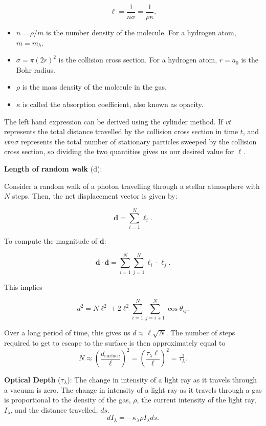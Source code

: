 \documentclass[12pt]{article}
\newcommand{\V}{

\vspace{\baselineskip}

}
\begin{document}
\[\ell = \frac{1}{n\sigma} = \frac{1}{\rho \kappa}.\]

\begin{itemize}
    \item $n = \rho / m$ is the number density of the molecule. For a hydrogen atom, $m = m_h$. 
    \item $\sigma = \pi(2r)^2$ is the collision cross section. For a hydrogen atom, $r = a_0$ is the Bohr radius. 
    \item $\rho$ is the mass density of the molecule in the gas.
    \item $\kappa$ is called the absorption coefficient, also known as opacity. 
\end{itemize}

The left hand expression can be derived using the cylinder method. If $vt$ represents the total distance travelled by the collision cross section in time $t$, and $vtn\sigma$ represents the total number of stationary particles sweeped by the collision cross section, so dividing the two quantities gives us our desired value for $\ell$.\V

\textbf{Length of random walk} (d): 

Consider a random walk of a photon travelling through a stellar atmosphere with $N$ steps. Then, the net displacement vector is given by: 

\[\mathbf{d} = \sum_{i=1}^N \bm{\ell}_i.\]

To compute the magnitude of $\mathbf{d}$:

\[\mathbf{d}\cdot \mathbf{d} = \sum_{i=1}^{N}\sum_{j=1}^N \bm{\ell}_i\cdot \bm{\ell}_j.\]

This implies

\[d^2 = N\ell^2 + 2\ell^2\sum_{i=1}^{N}\sum_{j=i+1}^{N}\cos{\theta_{ij}}.\]

Over a long period of time, this gives us $d\approx \ell \sqrt{N}$. The number of steps required to get to escape to the surface is then approximately equal to \[N \approx \left(\frac{d_{\text{surface}}}{\ell}\right)^2 = \left(\frac{\tau_{\lambda} \ell}{\ell}\right)^2 = \tau_{\lambda}^2. \]

\V

\textbf{Optical Depth} ($\tau_{\lambda}$): 
The change in intensity of a light ray as it travels through a vacuum is zero. The change in intensity of a light ray as it travels through a gas is proportional to the density of the gas, $\rho$, the current intensity of the light ray, $I_{\lambda}$, and the distance travelled, $ds$.
\[dI_{\lambda} = -\kappa_{\lambda}\rho I_{\lambda}ds.\]
\end{document}
